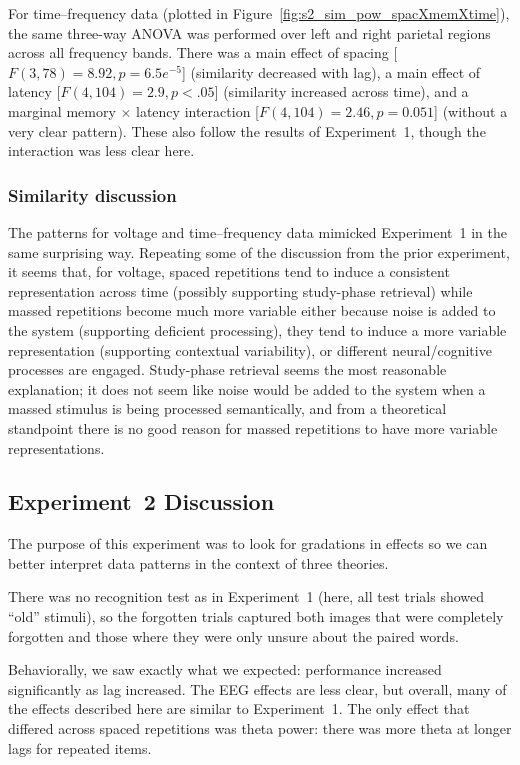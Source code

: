 For time--frequency data (plotted in Figure~\ref{fig:s2_sim_pow_spacXmemXtime}), the same three-way ANOVA was performed over left and right parietal regions across all frequency bands.
There was a main effect of spacing [$F(3,78)=8.92, p=6.5e^{-5}$] (similarity decreased with lag), a main effect of latency [$F(4,104)=2.9, p<.05$] (similarity increased across time), and a marginal memory $\times$ latency interaction [$F(4,104)=2.46, p=0.051$] (without a very clear pattern).  These also follow the results of Experiment~1, though the interaction was less clear here.

\subsubsection{Similarity discussion}

The patterns for voltage and time--frequency data mimicked Experiment~1 in the same surprising way.  Repeating some of the discussion from the prior experiment, it seems that, for voltage, spaced repetitions tend to induce a consistent representation across time (possibly supporting study-phase retrieval) while massed repetitions become much more variable either because noise is added to the system (supporting deficient processing), they tend to induce a more variable representation (supporting contextual variability), or different neural/cognitive processes are engaged.  Study-phase retrieval seems the most reasonable explanation; it does not seem like noise would be added to the system when a massed stimulus is being processed semantically, and from a theoretical standpoint there is no good reason for massed repetitions to have more variable representations.

\subsection{Experiment~2 Discussion}

The purpose of this experiment was to look for gradations in effects so we can better interpret data patterns in the context of three theories.

There was no recognition test as in Experiment~1 (here, all test trials showed ``old'' stimuli), so the forgotten trials captured both images that were completely forgotten and those where they were only unsure about the paired words.

Behaviorally, we saw exactly what we expected: performance increased significantly as lag increased.  The EEG effects are less clear, but overall, many of the effects described here are similar to Experiment~1.  The only effect that differed across spaced repetitions was theta power: there was more theta at longer lags for repeated items.


